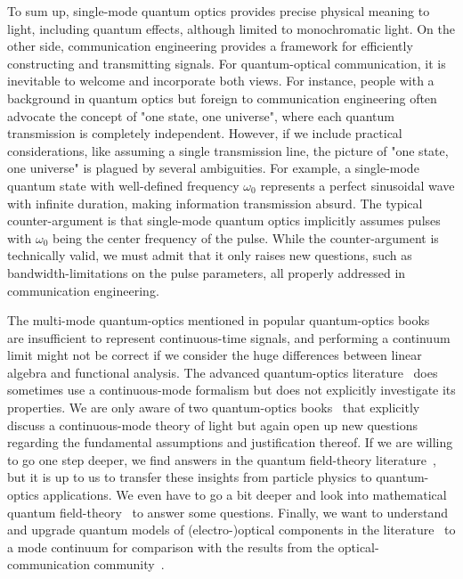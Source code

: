 To sum up, single-mode quantum optics provides precise physical meaning to light, including quantum effects, although limited to monochromatic light.
On the other side, communication engineering provides a framework for efficiently constructing and transmitting signals.
For quantum-optical communication, it is inevitable to welcome and incorporate both views.
For instance, people with a background in quantum optics but foreign to communication engineering often advocate the concept of "one state, one universe", where each quantum transmission is completely independent.
However, if we include practical considerations, like assuming a single transmission line, the picture of "one state, one universe" is plagued by several ambiguities.
For example, a single-mode quantum state with well-defined frequency $\omega_0$ represents a perfect sinusoidal wave with infinite duration, making information transmission absurd.
The typical counter-argument is that single-mode quantum optics implicitly assumes pulses with $\omega_0$ being the center frequency of the pulse.
While the counter-argument is technically valid, we must admit that it only raises new questions, such as bandwidth-limitations on the pulse parameters, all properly addressed in communication engineering.

The multi-mode quantum-optics mentioned in popular quantum-optics books~\cite{Gerry2005,Fox2006} are insufficient to represent continuous-time signals, and performing a continuum limit might not be correct if we consider the huge differences between linear algebra and functional analysis.
The advanced quantum-optics literature~\cite{Vogel2006,Mandel1995} does sometimes use a continuous-mode formalism but does not explicitly investigate its properties.
We are only aware of two quantum-optics books~\cite{Loudon2000,Barnett2002} that explicitly discuss a continuous-mode theory of light but again open up new questions regarding the fundamental assumptions and justification thereof.
If we are willing to go one step deeper, we find answers in the quantum field-theory literature~\cite{Peskin1995,Srednicki2007,Greiner2013,Itzykson2012}, but it is up to us to transfer these insights from particle physics to quantum-optics applications.
We even have to go a bit deeper and look into mathematical quantum field-theory~\cite{Streater2016,Bogoliubov1982,Bogolubov1989} to answer some questions.
Finally, we want to understand and upgrade quantum models of (electro-)optical components in the literature~\cite{Vogel2006,Leonhardt2003,Haroche2006,Mandel1995} to a mode continuum for comparison with the results from the optical-communication community~\cite{Shapiro2009,Kikuchi2016}.

